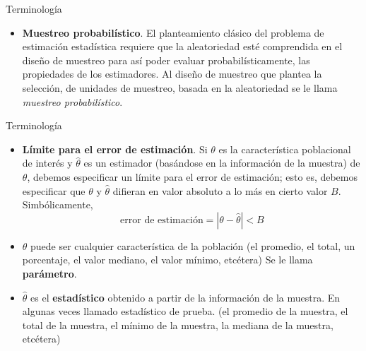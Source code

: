 \documentclass[
  10pt,
  ignorenonframetext,
]{beamer}
\providecommand{\tightlist}{%
  \setlength{\itemsep}{0pt}\setlength{\parskip}{0pt}}
\begin{document}
\begin{frame}{}
\protect\hypertarget{section-4}{}
\begin{block}{Terminología}
\protect\hypertarget{terminologuxeda-1}{}
\begin{itemize}
\tightlist
\item
  \textbf{Muestreo probabilístico}. El planteamiento clásico del
  problema de estimación estadística requiere que la aleatoriedad esté
  comprendida en el diseño de muestreo para así poder evaluar
  probabilísticamente, las propiedades de los estimadores. Al diseño de
  muestreo que plantea la selección, de unidades de muestreo, basada en
  la aleatoriedad se le llama \emph{muestreo probabilístico}.
\end{itemize}
\end{block}
\end{frame}

\begin{frame}{}
\protect\hypertarget{section-5}{}
\begin{block}{Terminología}
\protect\hypertarget{terminologuxeda-2}{}
\begin{itemize}
\item
  \textbf{Límite para el error de estimación}. Si \(\theta\) es la
  característica poblacional de interés y \(\hat{\theta}\) es un
  estimador (basándose en la información de la muestra) de \(\theta\),
  debemos especificar un límite para el error de estimación; esto es,
  debemos especificar que \(\theta\) y \(\hat{\theta}\) difieran en
  valor absoluto a lo más en cierto valor \(B\). Simbólicamente,
  \[\mbox{error de estimación}=|\theta - \hat{\theta} | < B\]
\item
  \(\theta\) puede ser cualquier característica de la población (el
  promedio, el total, un porcentaje, el valor mediano, el valor mínimo,
  etcétera) Se le llama \textbf{parámetro}.
\item
  \(\hat{\theta}\) es el \textbf{estadístico} obtenido a partir de la
  información de la muestra. En algunas veces llamado estadístico de
  prueba. (el promedio de la muestra, el total de la muestra, el mínimo
  de la muestra, la mediana de la muestra, etcétera)
\end{itemize}
\end{block}
\end{frame}
\end{document}
